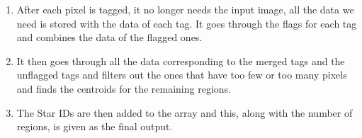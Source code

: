 \begin{enumerate}
\begin{enumerate}
\begin{enumerate}
        \end{enumerate}
        \item If only one of them is bright, the pixel is tagged with the corresponding tag and the data is added to the data of that tag
        \item If none of them are bright, it checks the pixel to the right and the one to the right of the one to the north\footnote{This is done to reduce the unnecessary creation of new tags and the resulting conflicts between tags that will eventually get connected at some pixel. The testing done so far has suggested that this is fairly effective in cutting down on the use of flags and the resulting merge.}.
            \begin{itemize}
                \item If both of those are bright, the pixel is tagged with the tag of the pixel to the right of the one to the north. 
                \item If not, the pixel is assigned a new tag and the data is added to the corresponding tag's data
            \end{itemize}
    \end{enumerate}
    \item After each pixel is tagged, it no longer needs the input image, all the data we need is stored with the data of each tag. It goes through the flags for each tag and combines the data of the flagged ones. 
    \item It then goes through all the data corresponding to the merged tags and the unflagged tags and filters out the ones that have too few or too many pixels and finds the centroids for the remaining regions.
    \item The Star IDs are then added to the array and this, along with the number of regions, is given as the final output.
\end{enumerate}
